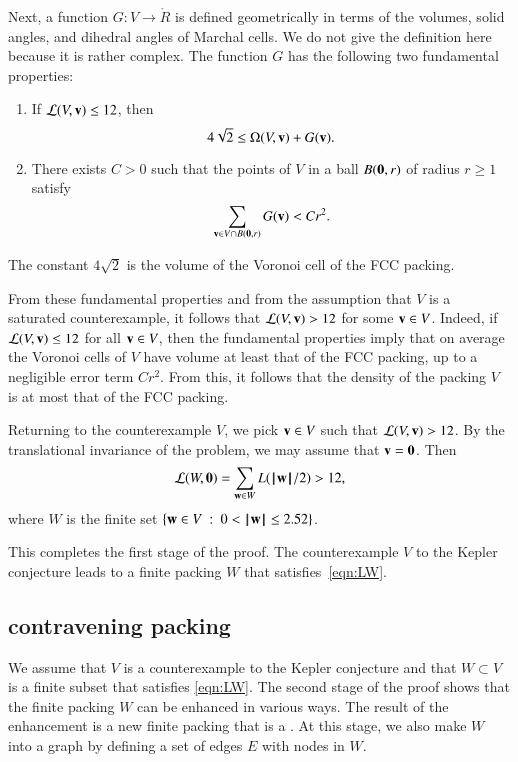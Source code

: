 Next, a function $G:V\to \ring{R}$ is defined geometrically in terms
of the volumes, solid angles, and dihedral angles of Marchal cells.
We do not give the definition here because it is rather
complex.  The function $G$ has the following two fundamental
properties:
\begin{enumerate}
\item If ${\mathcal L}(V,{\mathbf v})\le 12$, then 
\[
4\sqrt{2}\le \Omega(V,{\mathbf v}) +G({\mathbf v}).
\]
\item There exists $C>0$ such that the points of $V$ in a ball $B({\mathbf 0},r)$
of radius $r\ge 1$ satisfy
\[
\sum_{{\mathbf v}\in V \cap B({\mathbf 0},r)} G({\mathbf v}) < C r^2.
\]
\end{enumerate}
The constant $4\sqrt{2}$ is the volume of the Voronoi cell of the FCC packing.

From these fundamental properties and from the assumption that $V$ is a saturated counterexample,
it follows that ${\mathcal L}(V,{\mathbf v})>12$ for some ${\mathbf v}\in V$.  Indeed, if ${\mathcal L}(V,{\mathbf v})\le 12$ for all
${\mathbf v}\in V$, then the fundamental properties
imply that on average the Voronoi cells of $V$ have volume at least that of the FCC packing, up to a negligible error term $C r^2$.  From this, it follows that the density
of the packing $V$ is at most that of the FCC packing.



Returning to the counterexample $V$, we pick ${\mathbf v}\in V$ such that
${\mathcal L}(V,{\mathbf v})>12$.  By the translational invariance of the problem, we
may assume that ${\mathbf v}={\mathbf 0}$.  Then
\begin{equation}\label{eqn:LW}
{\mathcal L}(W,{\mathbf 0}) = \sum_{{\mathbf w}\in W} L({{\hskip0.1em|\hskip-0.15em|\hskip0.1em}{\mathbf w}{\hskip0.1em|\hskip-0.15em|\hskip0.1em}}/2)  > 12,
\end{equation}
where $W$ is the finite set  $\{{\mathbf w}\in V\ :\  0 < {{\hskip0.1em|\hskip-0.15em|\hskip0.1em}{\mathbf w}{\hskip0.1em|\hskip-0.15em|\hskip0.1em}} \le 2.52\}$.

This completes the first stage of the proof.
The counterexample $V$ to the Kepler conjecture leads to a finite packing $W$
that satisfies~\eqref{eqn:LW}.

\subsection{contravening packing}

We assume that $V$ is a counterexample to the Kepler conjecture and that $W\subset V$
is a finite subset that satisfies \eqref{eqn:LW}.
The second stage of the proof shows that the 
finite packing $W$ can be enhanced in various ways.  The result of the enhancement is
a new finite packing that is a .  At this stage, we also
make $W$ into a graph by defining a set of edges $E$ with nodes in $W$.

